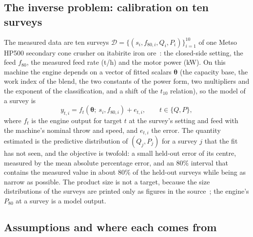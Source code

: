 \subsection{The inverse problem: calibration on ten surveys}\label{sec:problem-inverse}

The measured data are ten surveys $\mathcal D=\{(s_i, f_{80,i}, Q_i, P_i)\}_{i=1}^{10}$ of one Metso HP500 secondary cone
crusher on itabirite iron ore~\cite{rocha2024}: the closed-side setting, the feed $f_{80}$, the measured feed rate (t/h)
and the motor power (kW). On this machine the engine depends on a vector of fitted scalars $\boldsymbol\theta$ (the capacity
base, the work index of the blend, the two constants of the power form, two multipliers and the exponent of the
classification, and a shift of the $t_{10}$ relation), so the model of a survey is
\begin{equation}
y_{t,i} = f_t\!\left(\boldsymbol\theta;\ s_i, f_{80,i}\right) + e_{t,i},\qquad t\in\{Q, P\},
\label{eq:inverse}
\end{equation}
where $f_t$ is the engine output for target $t$ at the survey's setting and feed with the machine's nominal throw and speed,
and $e_{t,i}$ the error. The quantity estimated is the predictive distribution of $(Q_j, P_j)$ for a survey $j$ that the
fit has not seen, and the objective is twofold: a small held-out error of its centre, measured by the mean absolute
percentage error, and an $80\%$ interval that contains the measured value in about $80\%$ of the held-out surveys while
being as narrow as possible. The product size is not a target, because the size distributions of the surveys are printed
only as figures in the source~\cite{rocha2024}; the engine's $P_{80}$ at a survey is a model output.

\subsection{Assumptions and where each comes from}\label{sec:problem-assumptions}

